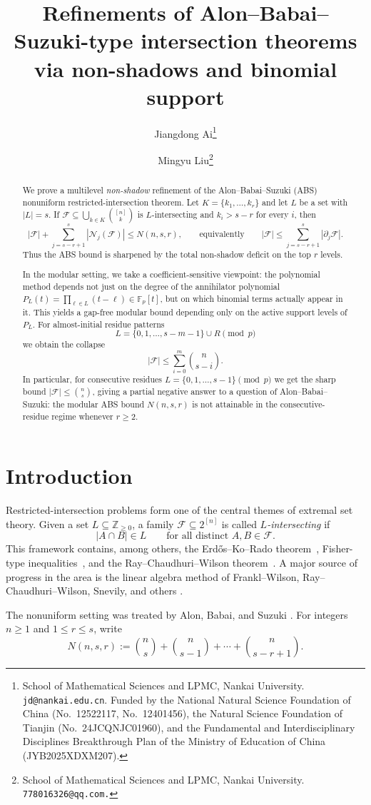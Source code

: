 \documentclass[11pt]{article}
\title{Refinements of Alon–Babai–Suzuki-type intersection theorems via non-shadows and binomial support}
\author{
Jiangdong Ai\thanks{School of Mathematical Sciences and LPMC, Nankai University. \texttt{jd@nankai.edu.cn}. Funded by the National Natural Science Foundation of China (No.~12522117, No.~12401456), the Natural Science Foundation of Tianjin (No.~24JCQNJC01960), and the Fundamental and Interdisciplinary Disciplines Breakthrough Plan of the Ministry of Education of China (JYB2025XDXM207).}%
\and
Mingyu Liu\thanks{School of Mathematical Sciences and LPMC, Nankai University. \texttt{778016326@qq.com.}
}}
\date{}
\theoremstyle{plain}
\theoremstyle{remark}
\newcommand{\F}{\mathcal{F}}
\newcommand{\N}{\mathcal{N}}
\newcommand{\bb}{\binom}
\newcommand{\abs}[1]{\left|#1\right|}
\begin{document}
\maketitle

\begin{abstract}
We prove a multilevel \emph{non-shadow} refinement of the Alon--Babai--Suzuki (ABS)
nonuniform restricted-intersection theorem.
Let $K=\{k_1,\dots,k_r\}$ and let $L$ be a set with $|L|=s$.
If $\F\subseteq \bigcup_{k\in K}\binom{[n]}{k}$ is $L$-intersecting and $k_i>s-r$ for every $i$, then
$$
  |\F|+\sum_{j=s-r+1}^{s}|\N_j(\F)|\le N(n,s,r),
  \qquad\text{equivalently}\qquad
  |\F|\le \sum_{j=s-r+1}^{s}|\partial_j\F|.
$$
Thus the ABS bound is sharpened by the total non-shadow deficit on the top $r$ levels.

In the modular setting, we take a coefficient-sensitive viewpoint: the polynomial method depends not just on the degree of the annihilator polynomial
$P_L(t)=\prod_{\ell\in L}(t-\ell)\in\mathbb{F}_p[t]$,
but on which binomial terms actually appear in it.
This yields a gap-free modular bound depending only on the active support levels of $P_L$.
For almost-initial residue patterns
$$
  L=\{0,1,\dots,s-m-1\}\cup R \pmod p
$$
we obtain the collapse
$$
  |\F|\le \sum_{i=0}^{m}\binom{n}{s-i}.
$$
In particular, for consecutive residues $L=\{0,1,\dots,s-1\}\pmod p$ we get the sharp bound
$|\F|\le \binom{n}{s}$, giving a partial negative answer to a question of Alon--Babai--Suzuki:
the modular ABS bound $N(n,s,r)$ is not attainable in the consecutive-residue regime whenever $r\ge 2$.
\end{abstract}

\section{Introduction}

Restricted-intersection problems form one of the central themes of extremal set theory.
Given a set $L\subseteq \mathbb{Z}_{\ge 0}$, a family $\F\subseteq 2^{[n]}$ is called
\emph{$L$-intersecting} if
$$
  \abs{A\cap B}\in L\qquad\text{for all distinct }A,B\in\F.
$$
This framework contains, among others, the Erd\H{o}s--Ko--Rado theorem~\cite{EKR}, Fisher-type inequalities~\cite{Fisher},
and the Ray--Chaudhuri--Wilson theorem~\cite{RCW}.
A major source of progress in the area is the linear algebra method of Frankl--Wilson,
Ray--Chaudhuri--Wilson, Snevily, and others
\cite{FranklW,RCW,Snevily95,Snevily03}.

The nonuniform setting was treated by Alon, Babai, and Suzuki \cite{ABS}.
For integers $n\ge 1$ and $1\le r\le s$, write
\begin{equation}\label{eq:Nnsr}
  N(n,s,r):=\bb{n}{s}+\bb{n}{s-1}+\cdots+\bb{n}{s-r+1}.
\end{equation}
\end{document}
